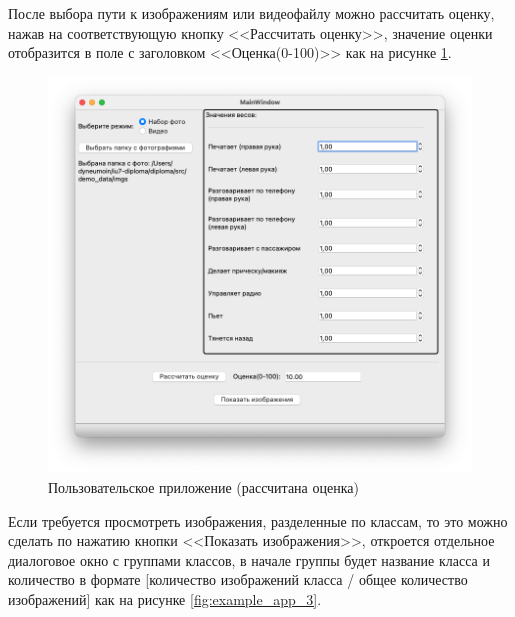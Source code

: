 После выбора пути к изображениям или видеофайлу можно рассчитать оценку, нажав на соответствующую кнопку <<Рассчитать оценку>>, значение оценки отобразится в поле с заголовком <<Оценка(0-100)>> как на рисунке \ref{fig:example_app_2}.

\begin{figure}[hbtp]
	\centering
	\includegraphics[scale=0.55]{img/example_app_2.png}
	\caption{Пользовательское приложение (рассчитана оценка)}
	\label{fig:example_app_2}
\end{figure}
\clearpage

Если требуется просмотреть изображения, разделенные по классам, то это можно сделать по нажатию кнопки <<Показать изображения>>, откроется отдельное диалоговое окно с группами классов, в начале группы будет название класса и количество в формате [количество изображений класса / общее количество изображений] как на рисунке \ref{fig:example_app_3}.

